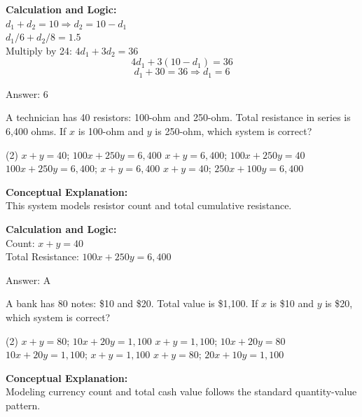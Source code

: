 \documentclass[11pt,paper=a4,answers]{exam}
\begin{document}
\begin{questions}
\begin{solution}
\vspace{10pt}
\textbf{Calculation and Logic:} \\
$d_1 + d_2 = 10 \Rightarrow d_2 = 10 - d_1$ \\
$d_1 / 6 + d_2 / 8 = 1.5$ \\
Multiply by 24: $4d_1 + 3d_2 = 36$ \\
\[4d_1 + 3(10 - d_1) = 36\]
\[d_1 + 30 = 36 \Rightarrow d_1 = 6\]

\vspace{15pt}
Answer: \colorbox{yellow!100}{6}
\end{solution}

\question
A technician has 40 resistors: 100-ohm and 250-ohm. Total resistance in series is 6,400 ohms. If $x$ is 100-ohm and $y$ is 250-ohm, which system is correct?
\begin{tasks}(2)
    \task $x + y = 40$; $100x + 250y = 6,400$
    \task $x + y = 6,400$; $100x + 250y = 40$
    \task $100x + 250y = 6,400$; $x + y = 6,400$
    \task $x + y = 40$; $250x + 100y = 6,400$
\end{tasks}

\begin{solution}
\textbf{Conceptual Explanation:} \\
This system models resistor count and total cumulative resistance.

\vspace{10pt}
\textbf{Calculation and Logic:} \\
Count: $x + y = 40$ \\
Total Resistance: $100x + 250y = 6,400$

\vspace{15pt}
Answer: \colorbox{yellow!100}{A}
\end{solution}

\question
A bank has 80 notes: \$10 and \$20. Total value is \$1,100. If $x$ is \$10 and $y$ is \$20, which system is correct?
\begin{tasks}(2)
    \task $x + y = 80$; $10x + 20y = 1,100$
    \task $x + y = 1,100$; $10x + 20y = 80$
    \task $10x + 20y = 1,100$; $x + y = 1,100$
    \task $x + y = 80$; $20x + 10y = 1,100$
\end{tasks}

\begin{solution}
\textbf{Conceptual Explanation:} \\
Modeling currency count and total cash value follows the standard quantity-value pattern.


\end{solution}
\end{questions}
\end{document}
